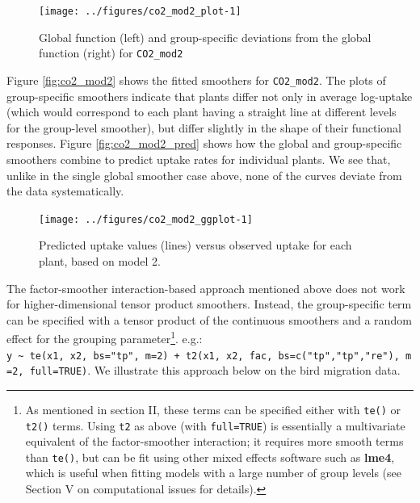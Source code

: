 \documentclass[12pt]{article}
\let\rmarkdownfootnote\footnote%
\def\footnote{\protect\rmarkdownfootnote}
\begin{document}
\begin{figure}
\texttt{[image: ../figures/co2\_mod2\_plot-1]} \caption{\label{fig:co2_mod2}Global function (left) and group-specific deviations from the global function (right) for \texttt{CO2\_mod2}}\label{fig:co2_mod2_plot}
\end{figure}

Figure \ref{fig:co2_mod2} shows the fitted smoothers for
\texttt{CO2\_mod2}. The plots of group-specific smoothers indicate that
plants differ not only in average log-uptake (which would correspond to
each plant having a straight line at different levels for the
group-level smoother), but differ slightly in the shape of their
functional responses. Figure \ref{fig:co2_mod2_pred} shows how the
global and group-specific smoothers combine to predict uptake rates for
individual plants. We see that, unlike in the single global smoother
case above, none of the curves deviate from the data systematically.

\begin{figure}
\texttt{[image: ../figures/co2\_mod2\_ggplot-1]} \caption{\label{fig:co2_mod2_pred}Predicted uptake values (lines) versus observed uptake for each plant, based on model 2.}\label{fig:co2_mod2_ggplot}
\end{figure}

The factor-smoother interaction-based approach mentioned above does not
work for higher-dimensional tensor product smoothers. Instead, the
group-specific term can be specified with a tensor product of the
continuous smoothers and a random effect for the grouping
parameter\footnote{As mentioned in section II, these terms can be
  specified either with \texttt{te()} or \texttt{t2()} terms. Using
  \texttt{t2} as above (with \texttt{full=TRUE}) is essentially a
  multivariate equivalent of the factor-smoother interaction; it
  requires more smooth terms than \texttt{te()}, but can be fit using
  other mixed effects software such as \textbf{lme4}, which is useful
  when fitting models with a large number of group levels (see Section V
  on computational issues for details).}. e.g.:
\texttt{y\ \textasciitilde{}\ te(x1,\ x2,\ bs="tp",\ m=2)\ +\ t2(x1,\ x2,\ fac,\ bs=c("tp","tp","re"),\ m=2,\ full=TRUE)}.
We illustrate this approach below on the bird migration data.
\end{document}
